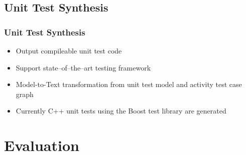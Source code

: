 \documentclass{beamer}
\begin{document}
\subsection{Unit Test Synthesis}
\begin{frame}
\frametitle{Unit Test Synthesis}
\begin{itemize} 
\item Output compileable unit test code
\item Support state--of--the--art testing framework
\item Model-to-Text transformation from unit test model and activity test case graph
\item Currently C++ unit tests using the Boost test library are generated
\end{itemize}
\end{frame}

\section{Evaluation}
\end{document}
